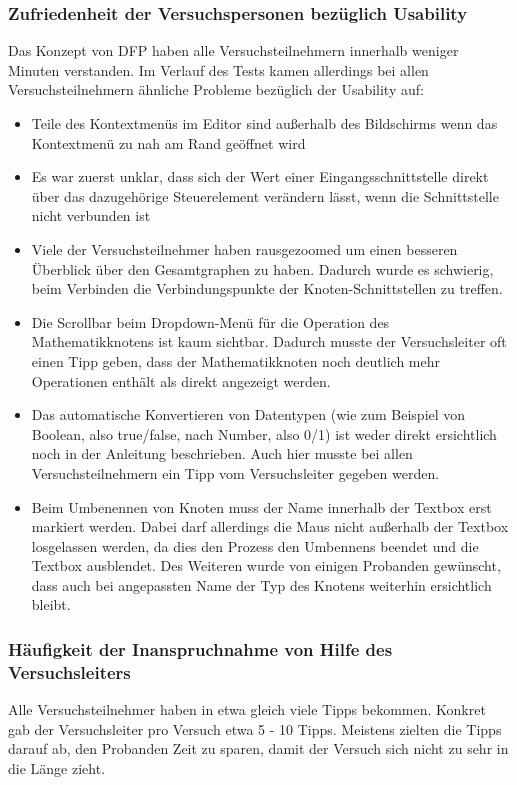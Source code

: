 \subsubsection{Zufriedenheit der Versuchspersonen bezüglich Usability}
Das Konzept von \ac{DFP} haben alle Versuchsteilnehmern innerhalb weniger Minuten verstanden. Im Verlauf des Tests kamen allerdings bei allen Versuchsteilnehmern ähnliche Probleme bezüglich der Usability auf:
\begin{itemize}
    \item Teile des Kontextmenüs im Editor sind außerhalb des Bildschirms wenn das Kontextmenü zu nah am Rand geöffnet wird
    \item Es war zuerst unklar, dass sich der Wert einer Eingangsschnittstelle direkt über das dazugehörige Steuerelement verändern lässt, wenn die Schnittstelle nicht verbunden ist
    \item Viele der Versuchsteilnehmer haben rausgezoomed um einen besseren Überblick über den Gesamtgraphen zu haben. Dadurch wurde es schwierig, beim Verbinden die Verbindungspunkte der Knoten-Schnittstellen zu treffen.
    \item Die Scrollbar beim Dropdown-Menü für die Operation des Mathematikknotens ist kaum sichtbar. Dadurch musste der Versuchsleiter oft einen Tipp geben, dass der Mathematikknoten noch deutlich mehr Operationen enthält als direkt angezeigt werden.
    \item Das automatische Konvertieren von Datentypen (wie zum Beispiel von Boolean, also true/false, nach Number, also 0/1) ist weder direkt ersichtlich noch in der Anleitung beschrieben. Auch hier musste bei allen Versuchsteilnehmern ein Tipp vom Versuchsleiter gegeben werden.
    \item Beim Umbenennen von Knoten muss der Name innerhalb der Textbox erst markiert werden. Dabei darf allerdings die Maus nicht außerhalb der Textbox losgelassen werden, da dies den Prozess den Umbennens beendet und die Textbox ausblendet. Des Weiteren wurde von einigen Probanden gewünscht, dass auch bei angepassten Name der Typ des Knotens weiterhin ersichtlich bleibt.
\end{itemize}

\subsubsection{Häufigkeit der Inanspruchnahme von Hilfe des Versuchsleiters}
Alle Versuchsteilnehmer haben in etwa gleich viele Tipps bekommen. Konkret gab der Versuchsleiter pro Versuch etwa 5 - 10 Tipps. Meistens zielten die Tipps darauf ab, den Probanden Zeit zu sparen, damit der Versuch sich nicht zu sehr in die Länge zieht.

